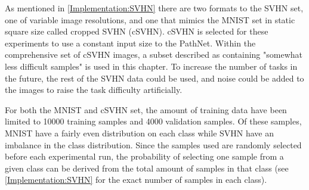 As mentioned in \ref{Implementation:SVHN} there are two formats to the SVHN set, one of variable image resolutions, and one that mimics the MNIST set in static square size called cropped SVHN (cSVHN). cSVHN is selected for these experiments to use a constant input size to the PathNet. Within the comprehensive set of cSVHN images, a subset described as containing "somewhat less difficult samples" is used in this chapter. To increase the number of tasks in the future, the rest of the SVHN data could be used, and noise could be added to the images to raise the task difficulty artificially. 

For both the MNIST and cSVHN set, the amount of training data have been limited to 10000 training samples and 4000 validation samples. Of these samples, MNIST have a fairly even distribution on each class while SVHN have an imbalance in the class distribution. Since the samples used are randomly selected before each experimental run, the probability of selecting one sample from a given class can be derived from the total amount of samples in that class (see \ref{Implementation:SVHN} for the exact number of samples in each class).

